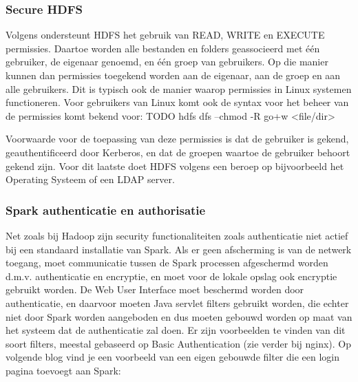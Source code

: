 \subsubsection{Secure HDFS}
Volgens \textcite{Hadoop2023b} ondersteunt HDFS het gebruik van READ, WRITE en EXECUTE permissies. Daartoe worden alle bestanden en folders geassocieerd met één gebruiker, de eigenaar genoemd, en één groep van gebruikers.
Op die manier kunnen dan permissies toegekend worden aan de eigenaar, aan de groep en aan alle gebruikers. Dit is typisch ook de manier waarop permissies in Linux systemen functioneren.
\newline
Voor gebruikers van Linux komt ook de syntax voor het beheer van de permissies komt bekend voor:
TODO
hdfs dfs –chmod -R go+w <file/dir>

\newline
Voorwaarde voor de toepassing van deze permissies is dat de gebruiker is gekend, geauthentificeerd door Kerberos, en dat de groepen waartoe de gebruiker behoort gekend zijn. Voor dit laatste doet HDFS volgens \textcite{Hadoop2023c} een beroep op bijvoorbeeld het Operating Systeem of een LDAP server.


\subsubsection {Spark authenticatie en authorisatie} \autocite{Spark2023c}
Net zoals bij Hadoop zijn security functionaliteiten zoals authenticatie niet actief bij een standaard installatie van Spark. Als er geen afscherming is van de netwerk toegang, moet communicatie tussen de Spark processen afgeschermd worden d.m.v. authenticatie en encryptie, en moet voor de lokale opslag ook encryptie gebruikt worden. De Web User Interface moet beschermd worden door authenticatie, en daarvoor moeten Java servlet filters gebruikt worden, die echter niet door Spark worden aangeboden en dus moeten gebouwd worden op maat van het systeem dat de authenticatie zal doen.
Er zijn voorbeelden te vinden van dit soort filters, meestal gebaseerd op Basic Authentication (zie verder bij nginx). Op volgende blog vind je een voorbeeld van een eigen gebouwde filter die een login pagina toevoegt aan Spark: \textcite{Cacoveanu2019}
\newline
\newline


